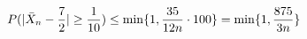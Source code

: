 \documentclass[preview]{standalone}
\begin{document}
\begin{align*}
\special{dvisvgm:raw <g id='unique000'>}P(|\bar X_n-\frac72|\ge\frac1{10})\le\min\{1,\frac{35}{12n}\cdot100\}=\min\{1,\frac{875}{3n}\}\special{dvisvgm:raw </g>}
\end{align*}
\end{document}
